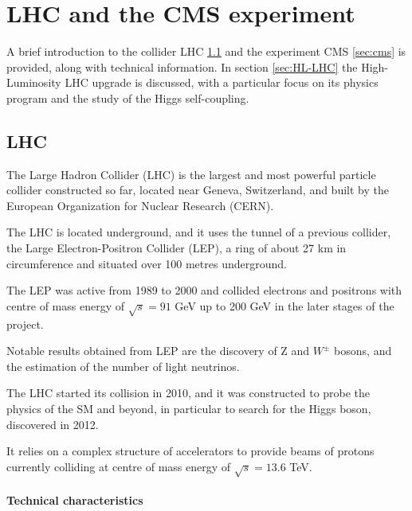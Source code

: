 \chapter{LHC and the CMS experiment}
\label{chap:chapter_3}
A brief introduction to the collider LHC \ref{sec:lhc} and the experiment CMS \ref{sec:cms} is provided, along with technical information. In section \ref{sec:HL-LHC} the High-Luminosity LHC upgrade is discussed, with a particular focus on its physics program and the study of the Higgs self-coupling.

\section{LHC}
\label{sec:lhc}
The Large Hadron Collider (LHC) is the largest and most powerful particle collider constructed so far, located near Geneva, Switzerland, and built by the European Organization for Nuclear Research (CERN).  

The LHC is located underground, and it uses the tunnel of a previous collider, the Large Electron-Positron Collider (LEP), a ring of about 27 km in circumference and situated over 100 metres underground.

The LEP was active from 1989 to 2000 and collided electrons and positrons with centre of mass energy of $\sqrt{s} = 91$ GeV up to 200 GeV in the later stages of the project.  

Notable results obtained from LEP are the discovery of Z and $W^{\pm}$ bosons, and the estimation of the number of light neutrinos.

The LHC started its collision in 2010, and it was constructed to probe the physics of the SM and beyond, in particular to search for the Higgs boson, discovered in 2012.

It relies on a complex structure of accelerators to provide beams of protons currently colliding at centre of mass energy of $\sqrt{s} = 13.6$ TeV.

\subsubsection{Technical characteristics}

